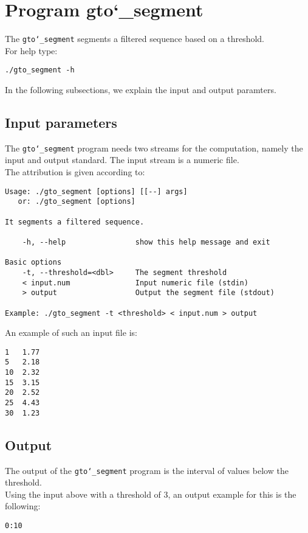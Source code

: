 \section{Program gto\char`_segment}
The \texttt{gto\char`_segment} segments a filtered sequence based on a threshold.\\
For help type:
\begin{lstlisting}
./gto_segment -h
\end{lstlisting}
In the following subsections, we explain the input and output paramters.

\subsection*{Input parameters}

The \texttt{gto\char`_segment} program needs two streams for the computation, namely the input and output standard. The input stream is a numeric file.\\
The attribution is given according to:
\begin{lstlisting}
Usage: ./gto_segment [options] [[--] args]
   or: ./gto_segment [options]

It segments a filtered sequence.

    -h, --help                show this help message and exit

Basic options
    -t, --threshold=<dbl>     The segment threshold
    < input.num               Input numeric file (stdin)
    > output                  Output the segment file (stdout)

Example: ./gto_segment -t <threshold> < input.num > output
\end{lstlisting}
An example of such an input file is:
\begin{lstlisting}
1   1.77
5   2.18
10  2.32
15  3.15
20  2.52
25  4.43
30  1.23
\end{lstlisting}

\subsection*{Output}
The output of the \texttt{gto\char`_segment} program is the interval of values below the threshold.\\
Using the input above with a threshold of 3, an output example for this is the following:
\begin{lstlisting}
0:10
\end{lstlisting}